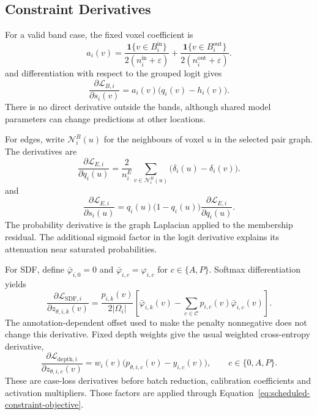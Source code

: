 \documentclass[12pt,a4paper]{article}
\begin{document}
\subsection{Constraint Derivatives}

For a valid band case, the fixed voxel coefficient is
\begin{equation}
a_i(v)=\frac{\mathbf{1}\{v\in B_i^{\mathrm{in}}\}}
                 {2(n_i^{\mathrm{in}}+\varepsilon)}
       +\frac{\mathbf{1}\{v\in B_i^{\mathrm{out}}\}}
                 {2(n_i^{\mathrm{out}}+\varepsilon)}.
\label{eq:band-voxel-coefficient}
\end{equation}
and differentiation with respect to the grouped logit gives
\begin{equation}
\frac{\partial\mathcal{L}_{B,i}}{\partial s_i(v)}
 =a_i(v)\bigl(q_i(v)-h_i(v)\bigr).
\label{eq:band-logit-gradient}
\end{equation}
There is no direct derivative outside the bands, although shared model
parameters can change predictions at other locations.

For edges, write $\mathcal N_i^B(u)$ for the neighbours of voxel $u$
in the selected pair graph. The derivatives are
\begin{equation}
\frac{\partial\mathcal{L}_{E,i}}{\partial q_i(u)}
=\frac{2}{n_i^E}\sum_{v\in\mathcal{N}_i^B(u)}
       \bigl(\delta_i(u)-\delta_i(v)\bigr).
\label{eq:edge-probability-gradient}
\end{equation}
and
\begin{equation}
\frac{\partial\mathcal{L}_{E,i}}{\partial s_i(u)}
=q_i(u)\bigl(1-q_i(u)\bigr)
  \frac{\partial\mathcal{L}_{E,i}}{\partial q_i(u)}.
\label{eq:edge-logit-gradient}
\end{equation}
The probability derivative is the graph Laplacian applied to the
membership residual. The additional sigmoid factor in the logit
derivative explains its attenuation near saturated probabilities.

For SDF, define $\bar\varphi_{i,0}=0$ and
$\bar\varphi_{i,c}=\varphi_{i,c}$ for $c\in\{A,P\}$. Softmax
differentiation yields
\begin{equation}
\frac{\partial\mathcal{L}_{\mathrm{SDF},i}}
     {\partial z_{\theta,i,k}(v)}
=\frac{p_{i,k}(v)}{2|\Omega_i|}
 \left[\bar\varphi_{i,k}(v)
       -\sum_{c\in\mathcal{C}}p_{i,c}(v)\bar\varphi_{i,c}(v)\right].
\label{eq:sdf-logit-gradient}
\end{equation}
The annotation-dependent offset used to make the penalty nonnegative
does not change this derivative. Fixed depth weights give the usual
weighted cross-entropy derivative,
\begin{equation}
\frac{\partial\mathcal{L}_{\mathrm{depth},i}}
     {\partial z_{\theta,i,c}(v)}
 =w_i(v)\bigl(p_{\theta,i,c}(v)-y_{i,c}(v)\bigr),
\qquad c\in\{0,A,P\}.
\label{eq:depth-logit-gradient}
\end{equation}
These are case-loss derivatives before batch reduction, calibration
coefficients and activation multipliers. Those factors are applied
through Equation~\ref{eq:scheduled-constraint-objective}.
\end{document}
